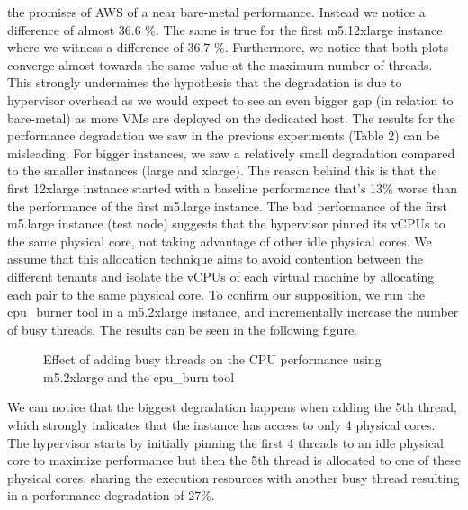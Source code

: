the promises of AWS of a near bare-metal performance. Instead we notice a difference of almost 36.6 \%. 
The same is true for the first m5.12xlarge instance where we witness a difference of 36.7 \%. Furthermore, we notice that both plots converge almost towards the same value at 
the maximum number of threads. This strongly undermines the hypothesis that the degradation is due to 
hypervisor overhead as we would expect to see an even bigger gap (in relation to bare-metal) as 
more VMs are deployed on the dedicated host. The results for the performance degradation we saw in 
the previous experiments (Table 2) can be misleading. For bigger instances, we saw a relatively small 
degradation compared to the smaller instances (large and xlarge). The reason behind this is that the 
first 12xlarge instance started with a baseline performance that's 13\% worse than the performance 
of the first m5.large instance.
The bad performance of the first m5.large instance (test node) suggests that the hypervisor 
pinned its vCPUs to the same physical core, not taking advantage of other idle physical cores. We 
assume that this allocation technique aims to avoid contention between the different tenants and 
isolate the vCPUs of each virtual machine by allocating each pair to the same physical core. To 
confirm our supposition, we run the cpu\_burner tool in a m5.2xlarge instance, and incrementally 
increase the number of busy threads. The results can be seen in the following figure. 
\begin{figure}[H]
\centering
{}
\caption{Effect of adding busy threads on the CPU performance using m5.2xlarge and the cpu\_burn tool} 
\end{figure}
\noindent
We can notice that the biggest degradation happens when adding the 5th thread, which strongly indicates 
that the instance has access to only 4 physical cores. The hypervisor starts by initially pinning the 
first 4 threads to an idle physical core to maximize performance but then the 5th thread is allocated 
to one of these physical cores, sharing the execution resources with another busy thread resulting in 
a performance degradation of 27\%.  \\
